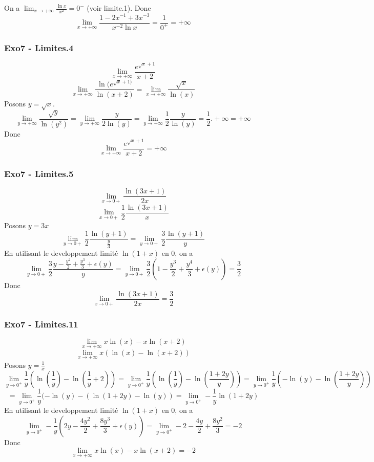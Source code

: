 \documentclass[]{book}
\theoremstyle{definition}
\begin{document}
On a $\lim_{x \to +\infty} \frac{\ln x}{x^2} = 0^{-}$ (voir limite.1).
Donc 
$$\lim_{x \to +\infty} \frac{1-2x^{-1}+3x^{-3}}{x^{-2}\ln x} = \frac{1}{0^{+}} = +\infty$$ 

\subsubsection*{Exo7 - Limites.4}
$$\lim_{x \to +\infty} \frac{e^{\sqrt{x}+1}}{x+2}$$
$$\lim_{x \to +\infty} \frac{\ln(e^{\sqrt{x}+1)}}{\ln(x+2)} = \lim_{x \to +\infty} \frac{\sqrt{x}}{\ln(x)}$$
Posons $y = \sqrt{x}$.
$$\lim_{y \to +\infty} \frac{\sqrt{y}}{\ln(y^2)} = \lim_{y \to +\infty} \frac{y}{2\ln(y)} = \lim_{y \to +\infty} \frac{1}{2}\frac{y}{\ln(y)} = \frac{1}{2} . +\infty = +\infty$$
Donc$$\lim_{x \to +\infty} \frac{e^{\sqrt{x}+1}}{x+2} = +\infty$$

\subsubsection*{Exo7 - Limites.5}
$$\lim_{x \to 0+} \frac{\ln(3x+1)}{2x}$$
$$\lim_{x \to 0+} \frac{1}{2}\frac{\ln(3x+1)}{x}$$
Posons $y=3x$
$$\lim_{y \to 0+} \frac{1}{2}\frac{\ln(y+1)}{\frac{y}{3}} = \lim_{y \to 0+} \frac{3}{2}\frac{\ln(y+1)}{y}$$
En utilisant le developpement limit\'e $\ln(1+x)$ en 0, on a
$$\lim_{y \to 0+} \frac{3}{2}\frac{y-\frac{y^2}{2}+ \frac{y^3}{3}+\epsilon(y)}{y} = \lim_{y \to 0+} \frac{3}{2}(1-\frac{y^3}{2} + \frac{y^4}{3}+\epsilon(y)) = \frac{3}{2}$$
Donc
$$\lim_{x \to 0+} \frac{\ln(3x+1)}{2x} = \frac{3}{2}$$


\subsubsection*{Exo7 - Limites.11}
$$\lim_{x \to +\infty}x\ln(x)-x\ln(x+2)$$
$$\lim_{x \to +\infty}x(\ln(x)-\ln(x+2))$$
Posons $y = \frac{1}{x}$
$$\lim_{y \to 0^+} \frac{1}{y}\left(\ln(\frac{1}{y})-\ln(\frac{1}{y}+2)\right) = \lim_{y \to 0^+} \frac{1}{y}\left(\ln(\frac{1}{y})-\ln(\frac{1+2y}{y})\right) = \lim_{y \to 0^+} \frac{1}{y}\left(-\ln(y)-\ln(\frac{1+2y}{y})\right) $$
$$= \lim_{y \to 0^+} \frac{1}{y}(-\ln(y)-(\ln(1+2y)-\ln(y)) = \lim_{y \to 0^+} -\frac{1}{y}\ln(1+2y)$$
En utilisant le developpement limit\'e $\ln(1+x)$ en 0, on a
$$\lim_{y \to 0^+} -\frac{1}{y}(2y - \frac{4y^2}{2} + \frac{8y^3}{3}+\epsilon(y)) = \lim_{y \to 0^+} -2 - \frac{4y}{2} + \frac{8y^2}{3} = -2$$
Donc
$$\lim_{x \to +\infty}x\ln(x)-x\ln(x+2) = -2$$
\end{document}
